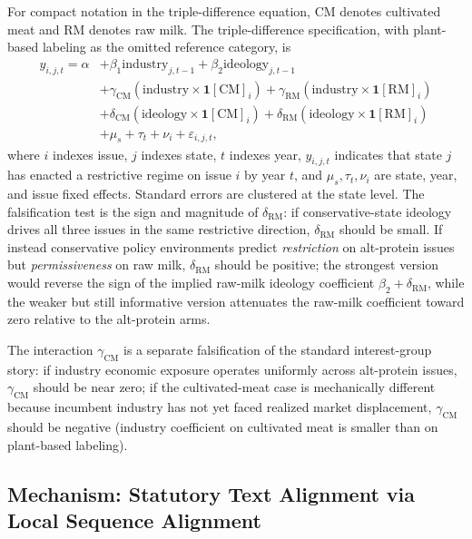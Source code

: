 \documentclass[12pt]{article}
\begin{document}
For compact notation in the triple-difference equation, CM denotes cultivated meat and RM denotes raw milk.  The triple-difference specification, with plant-based labeling as the omitted reference category, is
\begin{align}
y_{i,j,t} = \alpha &+ \beta_1 \mathrm{industry}_{j,t-1} + \beta_2 \mathrm{ideology}_{j,t-1} \nonumber \\
& + \gamma_{\mathrm{CM}}(\mathrm{industry} \times \mathbf{1}[\mathrm{CM}]_i) + \gamma_{\mathrm{RM}}(\mathrm{industry} \times \mathbf{1}[\mathrm{RM}]_i) \nonumber \\
& + \delta_{\mathrm{CM}}(\mathrm{ideology} \times \mathbf{1}[\mathrm{CM}]_i) + \delta_{\mathrm{RM}}(\mathrm{ideology} \times \mathbf{1}[\mathrm{RM}]_i) \nonumber \\
& + \mu_s + \tau_t + \nu_i + \varepsilon_{i,j,t},
\label{eq:triple_diff}
\end{align}
where $i$ indexes issue, $j$ indexes state, $t$ indexes year, $y_{i,j,t}$ indicates that state $j$ has enacted a restrictive regime on issue $i$ by year $t$, and $\mu_s, \tau_t, \nu_i$ are state, year, and issue fixed effects.  Standard errors are clustered at the state level.  The falsification test is the sign and magnitude of $\delta_{\mathrm{RM}}$: if conservative-state ideology drives all three issues in the same restrictive direction, $\delta_{\mathrm{RM}}$ should be small.  If instead conservative policy environments predict \emph{restriction} on alt-protein issues but \emph{permissiveness} on raw milk, $\delta_{\mathrm{RM}}$ should be positive; the strongest version would reverse the sign of the implied raw-milk ideology coefficient $\beta_2 + \delta_{\mathrm{RM}}$, while the weaker but still informative version attenuates the raw-milk coefficient toward zero relative to the alt-protein arms.

The interaction $\gamma_{\mathrm{CM}}$ is a separate falsification of the standard interest-group story: if industry economic exposure operates uniformly across alt-protein issues, $\gamma_{\mathrm{CM}}$ should be near zero; if the cultivated-meat case is mechanically different because incumbent industry has not yet faced realized market displacement, $\gamma_{\mathrm{CM}}$ should be negative (industry coefficient on cultivated meat is smaller than on plant-based labeling).

\subsection{Mechanism: Statutory Text Alignment via Local Sequence Alignment}
\label{sec:alignment}
\end{document}
